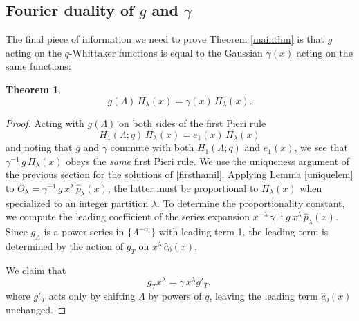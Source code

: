 \documentclass[12pt]{amsart}
\newtheorem{thm}{Theorem}[section]
\numberwithin{equation}{section}
\begin{document}
\subsection{Fourier duality of $g$ and $\gamma$}\label{sec:29}
The final piece of information we need to prove Theorem \ref{mainthm} is that $g$ acting on the $q$-Whittaker functions is equal to the 
Gaussian $\gamma(x)$ acting on the same functions:
\begin{thm}\label{fourierduathm}
\begin{equation}
g(\Lambda)\, \Pi_\lambda(x) = \gamma(x) \, \Pi_\lambda(x).
\end{equation}
\end{thm}
\begin{proof}
Acting with $g(\Lambda)$ on both sides of the first Pieri rule
\begin{equation}\label{firsthamil}
H_1(\Lambda;q)\, \Pi_\lambda(x) = e_1(x)\, \Pi_\lambda(x)
\end{equation}
and noting that $g$ and $\gamma$ commute with both $H_1(\Lambda;q)$ and $e_1(x)$, we see 
that $\gamma^{-1} \,g\, \Pi_\lambda(x)$ obeys the {\it same} first Pieri rule. 
We use the uniqueness argument of the previous section for the solutions of \eqref{firsthamil}. 
%
%
%
%
%
%
%
Applying Lemma \ref{uniquelem} to  $\Theta_\lambda=\gamma^{-1} \,g\, x^\lambda\,\hat p_\lambda(x)$, 
the latter must be proportional to $\Pi_\lambda(x)$ when specialized to an integer partition $\lambda$.
To determine the proportionality constant, we compute the leading coefficient of the series expansion $x^{-\lambda}\,\gamma^{-1} \,g\,x^\lambda\,\hat p_\lambda(x)$. Since $g_\Lambda$ is a power series in $\{\Lambda^{-\alpha_i}\}$ with leading term 1, the leading term is determined by the action of $g_T$ on $x^\lambda\,\hat c_0(x)$. 

We claim that
$$
g_T x^\lambda = \gamma\, x^{\lambda} {g}'_T,
$$
where $g'_T$ acts only by shifting $\Lambda$ by powers of $q$, leaving the leading term $\hat c_0(x)$ unchanged. 


\end{proof}
\end{document}
